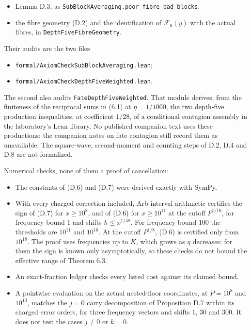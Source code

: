\documentclass[11pt,a4paper]{article}
\providecommand{\tightlist}{\setlength{\itemsep}{0pt}\setlength{\parskip}{0pt}}
\begin{document}
\begin{itemize}
\tightlist
\item
  Lemma D.3, as \texttt{SubBlockAveraging.poor\_fibre\_bad\_blocks};
\item
  the fibre geometry (D.2) and the identification of \(\mathcal F_a(y)\)
  with the actual fibres, in \texttt{DepthFiveFibreGeometry}.
\end{itemize}

Their audits are the two files

\begin{itemize}
\tightlist
\item
  \texttt{formal/AxiomCheckSubBlockAveraging.lean};
\item
  \texttt{formal/AxiomCheckDepthFiveWeighted.lean}.
\end{itemize}

The second also audits \texttt{FateDepthFiveWeighted}. That module
derives, from the finiteness of the reciprocal sums in (6.1) at
\(\eta=1/1000\), the two depth-five production inequalities, at
coefficient \(1/28\), of a conditional contagion assembly in the
laboratory's Lean library. No published companion text uses these
productions; the companion notes on fate contagion still record them as
unavailable. The square-wave, second-moment and counting steps of D.2,
D.4 and D.8 are not formalized.

Numerical checks, none of them a proof of cancellation:

\begin{itemize}
\tightlist
\item
  The constants of (D.6) and (D.7) were derived exactly with SymPy.
\item
  With every charged correction included, Arb interval arithmetic
  certifies the sign of (D.7) for \(x\ge10^8\), and of (D.6) for
  \(x\ge10^{11}\) at the cutoff \(P^{1/16}\), for frequency bound \(1\)
  and shifts \(h\le x^{1/48}\). For frequency bound \(100\) the
  thresholds are \(10^{11}\) and \(10^{16}\). At the cutoff \(P^{1/8}\),
  (D.6) is certified only from \(10^{18}\). The proof uses frequencies
  up to \(K\), which grows as \(\eta\) decreases; for them the sign is
  known only asymptotically, so these checks do not bound the effective
  range of Theorem 6.3.
\item
  An exact-fraction ledger checks every listed cost against its claimed
  bound.
\item
  A pointwise evaluation on the actual nested-floor coordinates, at
  \(P=10^8\) and \(10^{10}\), matches the \(j=0\) carry decomposition of
  Proposition D.7 within its charged error orders, for three frequency
  vectors and shifts \(1\), \(30\) and \(300\). It does not test the
  cases \(j\ne0\) or \(k=0\).
\end{itemize}
\end{document}
